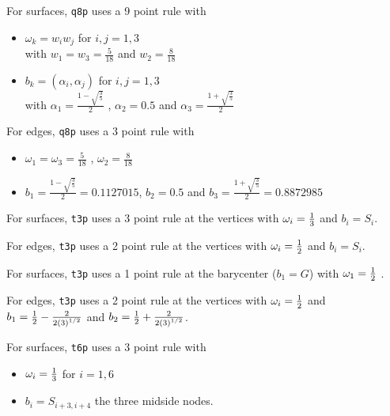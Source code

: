 

For surfaces, {\tt q8p} uses a 9 point rule with 
  \begin{itemize} 
    \item $\omega_k = w_i w_j$ for $i,j=1,3$  \\ with
         $w_1 = w_3 = \frac{5}{18} $ and $w_2 = \frac{8}{18} $
    \item $b_k =  (\alpha_i, \alpha_j) $ for $i,j=1,3$\\ with
          $ \alpha_1 = \frac{ 1 - \sqrt{\frac{3}{5}}}{2} $ , $ \alpha_2 = 0.5 $ 
          and $ \alpha_3 = \frac{ 1 + \sqrt{\frac{3}{5}}}{2} $
  \end{itemize}

For edges, {\tt q8p} uses a 3 point rule with 
  \begin{itemize} 
    \item $\omega_1 = \omega_3 =  \frac{5}{18}$ , $ \omega_2 =  \frac{8}{18} $
    \item $b_1 = \frac{ {1- \sqrt{\frac{3}{5}}  }} {2 } = 0.1127015 $, $ b_2 = 0.5 $
          and $b_3 = \frac{1 +  \sqrt{\frac{3}{5}}} {2} = 0.8872985 $  
  \end{itemize}



For surfaces, {\tt t3p} uses a 3 point rule at the vertices with $\omega_i = {1 \over 3}$ and $b_i=S_i$.

For edges,  {\tt t3p} uses a 2 point rule at the vertices with $\omega_i = {1 \over 2}$ and $b_i=S_i$.



For surfaces, {\tt t3p} uses a 1 point rule at the barycenter ($b_1=G$) with $\omega_1 = {1 \over 2}$  .

For edges,  {\tt t3p} uses a 2 point rule at the vertices with $\omega_i = {1 \over 2}$ and $b_1 = {1 \over 2} - { 2 \over {2 \sqrt{3}} } $ and $b_2 ={1 \over 2} + { 2 \over {2 \sqrt{3}} } $.



For surfaces, {\tt t6p} uses a 3 point rule with 

  \begin{itemize} 
    \item $\omega_i = {1 \over 3}$ for $i=1,6$
    \item $b_{i} = S_{i+3,i+4}$ the three midside nodes.
  \end{itemize}

